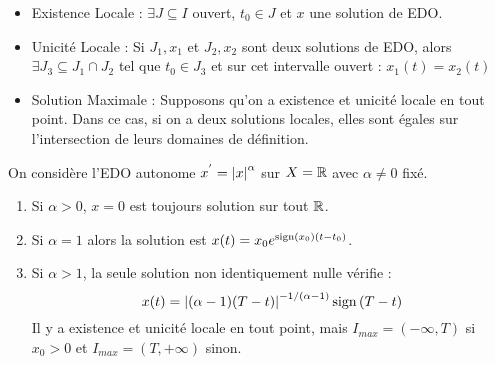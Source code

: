 \documentclass{cours}
\begin{document}
\begin{definition}
	\begin{itemize}
		\item Existence Locale : $\exists J \subseteq I$ ouvert, $t_{0} \in J$ et $x$ une solution de EDO. 
		\item Unicité Locale : Si $J_{1}, x_{1}$ et $J_{2}, x_{2}$ sont deux solutions de EDO, alors $\exists J_{3} \subseteq J_{1} \cap J_{2}$ tel que $t_{0} \in J_{3}$ et sur cet intervalle ouvert : $x_{1}(t) = x_{2}(t)$
		\item Solution Maximale : Supposons qu'on a existence et unicité locale en tout point. Dans ce cas, si on a deux solutions locales, elles sont égales sur l'intersection de leurs domaines de définition. 
    \end{itemize}
\end{definition}

\begin{remark}
	On considère l'EDO autonome $x^{'} = \left|x\right|^{\alpha}$ sur $X = \mathbb{R}$ avec $\alpha \neq 0$ fixé. 
	\begin{enumerate}
		\item Si $\alpha > 0$, $x = 0$ est toujours solution sur tout $\mathbb{R}$. 
		\item Si $\alpha = 1$ alors la solution est $x(t) = x_{0}e^{\operatorname{sign}(x_{0})(t - t_{0})}$. 
		\item Si $\alpha > 1$, la seule solution non identiquement nulle vérifie : 
			\[
				x(t) = \left|(\alpha - 1)(T - t)\right|^{- 1 / (\alpha - 1)}\operatorname{sign}{(T-t)}
			\]
			Il y a existence et unicité locale en tout point, mais $I_{max} = \left(-\infty, T\right)$ si $x_{0}  > 0$ et $I_{max} = \left(T, +\infty\right)$ sinon. 
    \end{enumerate}
\end{remark}
\end{document}
